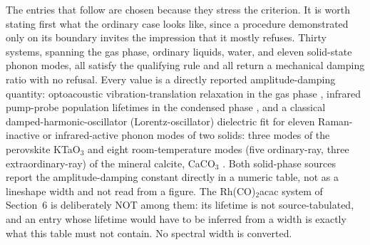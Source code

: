The entries that follow are chosen because they stress the criterion. It is worth stating first what the ordinary case looks like, since a procedure demonstrated only on its boundary invites the impression that it mostly refuses. Thirty systems, spanning the gas phase, ordinary liquids, water, and eleven solid-state phonon modes, all satisfy the qualifying rule and all return a mechanical damping ratio with no refusal. Every value is a directly reported amplitude-damping quantity: optoacoustic vibration-translation relaxation in the gas phase \citep{cannemeijer1973,cannemeijer1974,ch4vt,cottrell1966}, infrared pump-probe population lifetimes in the condensed phase \citep{tokmakoff1994,steinel2004,owrutsky1991}, and a classical damped-harmonic-oscillator (Lorentz-oscillator) dielectric fit for eleven Raman-inactive or infrared-active phonon modes of two solids: three modes of the perovskite KTaO$_3$ \citep{mori2026} and eight room-temperature modes (five ordinary-ray, three extraordinary-ray) of the mineral calcite, CaCO$_3$ \citep{posch2007}. Both solid-phase sources report the amplitude-damping constant directly in a numeric table, not as a lineshape width and not read from a figure. The Rh(CO)$_2$acac system of Section~6 is deliberately NOT among them: its lifetime is not source-tabulated, and an entry whose lifetime would have to be inferred from a width is exactly what this table must not contain. No spectral width is converted.

